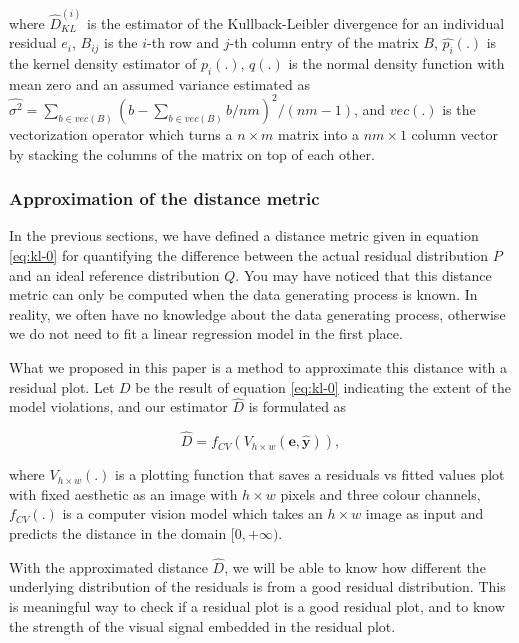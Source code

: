 \documentclass[]{interact}
\theoremstyle{plain}%
\theoremstyle{definition}
\theoremstyle{remark}
\begin{document}
\noindent where \(\hat{D}_{KL}^{(i)}\) is the estimator of the
Kullback-Leibler divergence for an individual residual \(e_i\),
\(B_{ij}\) is the \(i\)-th row and \(j\)-th column entry of the matrix
\(B\), \(\hat{p_i}(.)\) is the kernel density estimator of \(p_i(.)\),
\(q(.)\) is the normal density function with mean zero and an assumed
variance estimated as
\(\widehat{\sigma^2} = \sum_{b \in vec(B)}(b - \sum_{b \in vec(B)} b/nm)^2/(nm - 1)\),
and \(vec(.)\) is the vectorization operator which turns a
\(n \times m\) matrix into a \(nm \times 1\) column vector by stacking
the columns of the matrix on top of each other.

\hypertarget{approximation-of-the-distance-metric}{%
\subsubsection{Approximation of the distance
metric}\label{approximation-of-the-distance-metric}}

In the previous sections, we have defined a distance metric given in
equation \ref{eq:kl-0} for quantifying the difference between the actual
residual distribution \(P\) and an ideal reference distribution \(Q\).
You may have noticed that this distance metric can only be computed when
the data generating process is known. In reality, we often have no
knowledge about the data generating process, otherwise we do not need to
fit a linear regression model in the first place.

What we proposed in this paper is a method to approximate this distance
with a residual plot. Let \(D\) be the result of equation \ref{eq:kl-0}
indicating the extent of the model violations, and our estimator
\(\hat{D}\) is formulated as

\begin{equation}
\label{eq:d-approx}
\hat{D} = f_{CV}(V_{h \times w}(\boldsymbol{e}, \hat{\boldsymbol{y}})),
\end{equation}

\noindent where \(V_{h \times w}(.)\) is a plotting function that saves
a residuals vs fitted values plot with fixed aesthetic as an image with
\(h \times w\) pixels and three colour channels, \(f_{CV}(.)\) is a
computer vision model which takes an \(h \times w\) image as input and
predicts the distance in the domain \([0, +\infty)\).

With the approximated distance \(\hat{D}\), we will be able to know how
different the underlying distribution of the residuals is from a good
residual distribution. This is meaningful way to check if a residual
plot is a good residual plot, and to know the strength of the visual
signal embedded in the residual plot.
\end{document}
